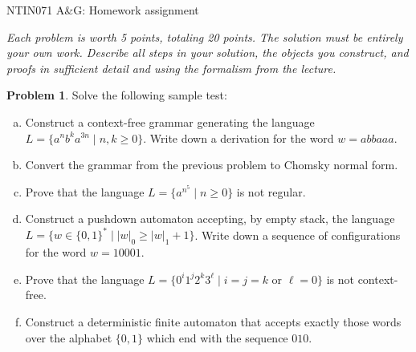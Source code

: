 \documentclass[a4paper,12pt]{article}
\theoremstyle{definition}
\newtheorem{problem}{Problem}
\begin{document}
\begin{center}
    \large{NTIN071 A\&G: Homework assignment}    
\end{center}


{\it  Each problem is worth 5 points, totaling 20 points. The solution must be entirely your own work. Describe all steps in your solution, the objects you construct, and proofs in sufficient detail and using the formalism from the lecture.}

\bigskip

\begin{problem}
    Solve the following sample test:

    \begin{enumerate}[(a)]
        \item Construct a context-free grammar generating the language $L=\{a^nb^ka^{3n}\mid n,k\geq 0\}$. Write down a derivation for the word $w=abbaaa$.
        \item Convert the grammar from the previous problem to Chomsky normal form.
        \item Prove that the language $L=\{a^{n^5}\mid n\geq 0\}$ is not regular.
        \item Construct a pushdown automaton accepting, by empty stack, the language $L=\{w\in\{0,1\}^*\mid |w|_0\geq |w|_1 + 1\}$. Write down a sequence of configurations for the word $w=10001$.
        \item Prove that the language $L=\{0^i1^j2^k3^\ell\mid i=j=k\text{ or }\ell=0\}$ is not context-free.
        \item Construct a deterministic finite automaton that accepts exactly those words over the alphabet $\{0,1\}$ which end with the sequence $010$.
    \end{enumerate}

\end{problem}


\bigskip
\end{document}
